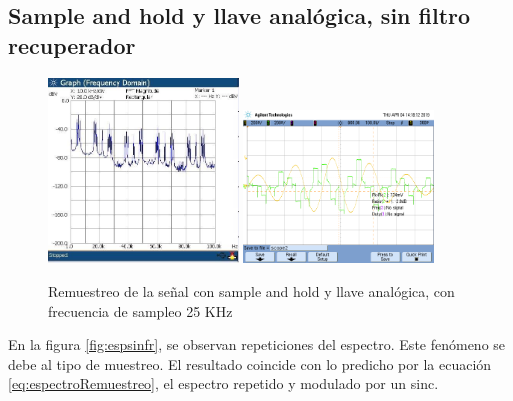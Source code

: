 \documentclass[../../ASSD_TP1_G7.tex]{subfiles}
\begin{document}
\subsection*{Sample and hold y llave analógica, sin filtro recuperador}

\begin{figure}[H]
\centering
{}

{\includegraphics[width=0.45\textwidth]{figures/sinfr.jpeg}} 
{\includegraphics[width=0.45\textwidth]{figures/scope2.png}}
\caption{Remuestreo de la se\~nal con sample and hold y llave analógica, con frecuencia de sampleo 25 KHz}
\end{figure}

En la figura \ref{fig:espsinfr}, se observan repeticiones del espectro. Este fenómeno se debe al tipo de muestreo. El resultado coincide con lo predicho por la ecuación \ref{eq:espectroRemuestreo}, el espectro repetido y modulado por un sinc.
\end{document}
